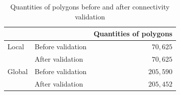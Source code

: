 \begin{table}[t]
\renewcommand{\arraystretch}{1.3}
\caption{Quantities of polygons before and after connectivity validation}
\label{tbl:Connectivity}
\centering
\begin{tabular}
{@{}llr@{}}
\toprule
~      &                         & Quantities of polygons \\
\hline\hline
Local  & Before validation       & $70,625$  \\
~      & After validation        & $70,625$  \\
\hline\hline
Global & Before validation       & $205,590$ \\
~      & After validation        & $205,452$ \\
\bottomrule
\end{tabular}
\end{table}
